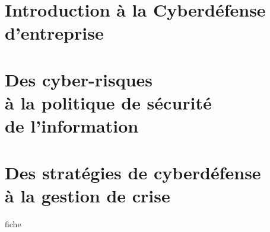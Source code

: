 

\part[Cyber-généralités]{Introduction à la Cyberdéfense d'entreprise}




\part[Risques et Mesures de sécurité]{Des cyber-risques \\à la politique de sécurité \\de l'information}





\part[Sécurité opérationnelle]{Des stratégies de cyberdéfense \\à la gestion de crise}


fiche
